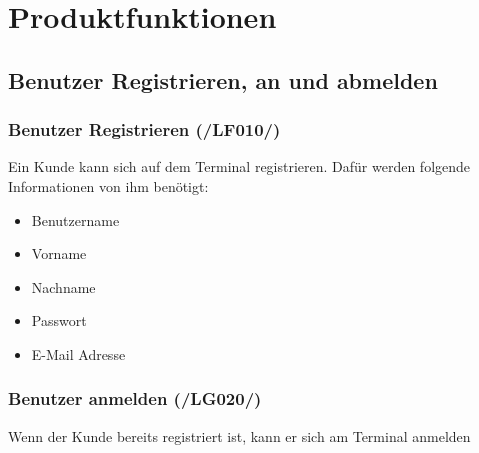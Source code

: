 
\section{Produktfunktionen}
\subsection{Benutzer Registrieren, an und abmelden}
\subsubsection{Benutzer Registrieren (/LF010/)}
Ein Kunde kann sich auf dem Terminal registrieren. Dafür werden folgende Informationen von ihm benötigt:
\begin{itemize}
    \item Benutzername
    \item Vorname
    \item Nachname
    \item Passwort
    \item E-Mail Adresse
\end{itemize}
\subsubsection{Benutzer anmelden (/LG020/)}
Wenn der Kunde bereits registriert ist, kann er sich am Terminal anmelden